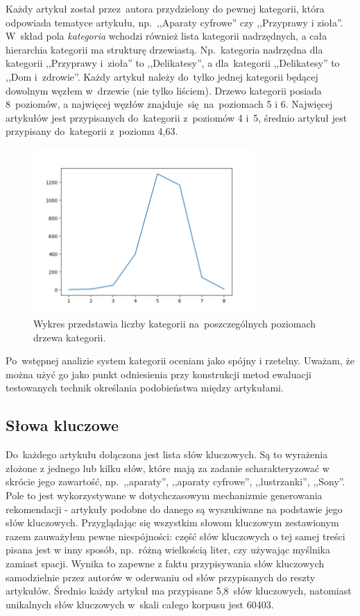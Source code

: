 \documentclass[pl]{minipw} %
\begin{document}
Każdy artykuł został przez~autora przydzielony do pewnej kategorii, która odpowiada tematyce artykułu, np.~,,Aparaty cyfrowe'' czy ,,Przyprawy i zioła''. W~skład pola \textit{kategoria} wchodzi również lista kategorii nadrzędnych, a cała hierarchia kategorii ma strukturę drzewiastą. Np.~kategoria nadrzędna dla kategorii ,,Przyprawy i~zioła'' to ,,Delikatesy'', a dla~kategorii ,,Delikatesy'' to ,,Dom i~zdrowie''. Każdy artykuł należy do~tylko jednej kategorii będącej dowolnym węzłem w~drzewie (nie tylko liściem). Drzewo kategorii posiada 8~poziomów, a najwięcej węzłów znajduje~się na~poziomach 5 i 6. Najwięcej artykułów jest przypisanych do~kategorii z~poziomów 4 i~5, średnio artykuł jest przypisany do~kategorii z~poziomu 4,63.
\begin{figure}[H]
	\centering
	\includegraphics[width=0.75\textwidth]{img/categories_levels.png}
	\caption{Wykres przedstawia liczby kategorii na~poszczególnych poziomach drzewa kategorii.}
\end{figure}
Po~wstępnej analizie system kategorii oceniam jako spójny i rzetelny. Uważam, że można użyć go jako punkt odniesienia przy konstrukcji metod ewaluacji testowanych technik określania podobieństwa między artykułami.
\subsection{Słowa kluczowe}
Do~każdego artykułu dołączona jest lista słów kluczowych. Są to wyrażenia złożone z jednego lub kilku słów, które mają za zadanie scharakteryzować w skrócie jego zawartość, np.~,,aparaty'', ,,aparaty cyfrowe'', ,,lustrzanki'', ,,Sony''. Pole to jest wykorzystywane w dotychczasowym mechanizmie generowania rekomendacji - artykuły podobne do danego są wyszukiwane na podstawie jego słów kluczowych. Przyglądając się wszystkim słowom kluczowym zestawionym razem zauważyłem pewne niespójności: część słów kluczowych o tej samej treści pisana jest w inny sposób, np.~różną wielkością liter, czy używając myślnika zamiast spacji. Wynika to zapewne z faktu przypisywania słów kluczowych samodzielnie przez autorów w oderwaniu od słów przypisanych do reszty artykułów. Średnio każdy artykuł ma przypisane 5,8~słów kluczowych, natomiast unikalnych słów kluczowych w~skali całego korpusu jest 60403.
\end{document}

